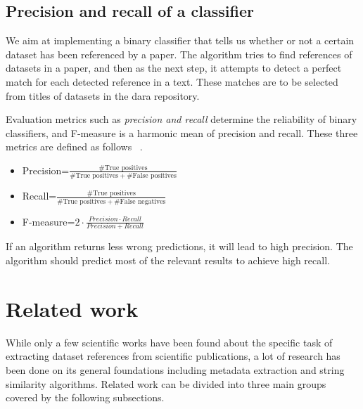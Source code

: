 \documentclass{IOS-Book-Article}
\newcommand{\dara}{\textsf{da\textbar ra}}
\begin{document}
\subsection{Precision and recall of a classifier}
\label{sec:precision-recall}
We aim at implementing a binary classifier that tells us whether or not a certain dataset has been referenced by a paper. The algorithm tries to find references of datasets in a paper, and then as the next step, it attempts to detect a perfect match for each detected reference in a text. These matches are to be selected from titles of datasets in the {\dara} repository. 

Evaluation metrics such as \emph{precision and recall} determine the reliability of binary classifiers, and F-measure is a harmonic mean of precision and recall. These three metrics are defined as follows ~\cite{Powers2011}. 
\begin{itemize}
	\item Precision=$\frac{\#\text{True\ positives}}{\#\text{True positives}+\#\text{False positives}}$
	\item Recall=$\frac{\#\text{True positives}}{\#\text{True positives}+\#\text{False negatives}}$
	\item F-measure=$2\cdot{\frac{\mathit{Precision}\cdot\mathit{Recall}}{\mathit{Precision}+\mathit{Recall}}}$
\end{itemize}

If an algorithm returns less wrong predictions, it will lead to high precision. The algorithm should predict most of the relevant results to achieve high recall.
\section{Related work}
\label{sec:relWork}
While only a few scientific works have been found about the specific task of extracting dataset references from scientific publications, a lot of research has been done on its general foundations including metadata extraction and string similarity algorithms. 
Related work can be divided into three main groups covered by the following subsections.
\end{document}
